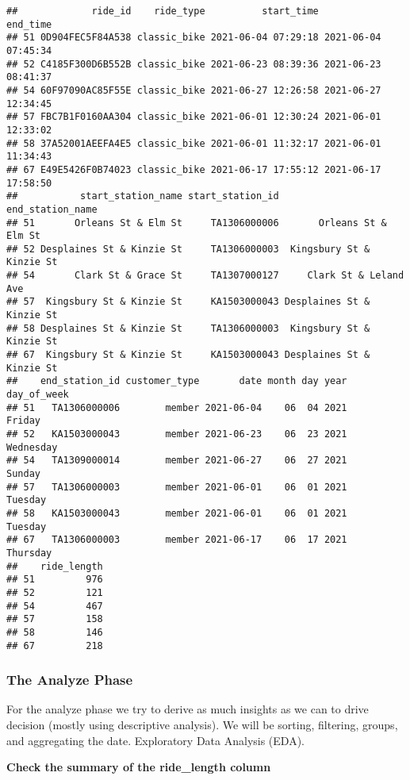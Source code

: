 \documentclass[
]{article}
\newenvironment{Shaded}{\begin{snugshade}}{\end{snugshade}}
\newcommand{\FunctionTok}[1]{\textcolor[rgb]{0.00,0.00,0.00}{#1}}
\newcommand{\NormalTok}[1]{#1}
\newcommand{\SpecialCharTok}[1]{\textcolor[rgb]{0.00,0.00,0.00}{#1}}
\begin{document}
\begin{verbatim}
##             ride_id    ride_type          start_time            end_time
## 51 0D904FEC5F84A538 classic_bike 2021-06-04 07:29:18 2021-06-04 07:45:34
## 52 C4185F300D6B552B classic_bike 2021-06-23 08:39:36 2021-06-23 08:41:37
## 54 60F97090AC85F55E classic_bike 2021-06-27 12:26:58 2021-06-27 12:34:45
## 57 FBC7B1F0160AA304 classic_bike 2021-06-01 12:30:24 2021-06-01 12:33:02
## 58 37A52001AEEFA4E5 classic_bike 2021-06-01 11:32:17 2021-06-01 11:34:43
## 67 E49E5426F0B74023 classic_bike 2021-06-17 17:55:12 2021-06-17 17:58:50
##           start_station_name start_station_id          end_station_name
## 51       Orleans St & Elm St     TA1306000006       Orleans St & Elm St
## 52 Desplaines St & Kinzie St     TA1306000003  Kingsbury St & Kinzie St
## 54       Clark St & Grace St     TA1307000127     Clark St & Leland Ave
## 57  Kingsbury St & Kinzie St     KA1503000043 Desplaines St & Kinzie St
## 58 Desplaines St & Kinzie St     TA1306000003  Kingsbury St & Kinzie St
## 67  Kingsbury St & Kinzie St     KA1503000043 Desplaines St & Kinzie St
##    end_station_id customer_type       date month day year day_of_week
## 51   TA1306000006        member 2021-06-04    06  04 2021      Friday
## 52   KA1503000043        member 2021-06-23    06  23 2021   Wednesday
## 54   TA1309000014        member 2021-06-27    06  27 2021      Sunday
## 57   TA1306000003        member 2021-06-01    06  01 2021     Tuesday
## 58   KA1503000043        member 2021-06-01    06  01 2021     Tuesday
## 67   TA1306000003        member 2021-06-17    06  17 2021    Thursday
##    ride_length
## 51         976
## 52         121
## 54         467
## 57         158
## 58         146
## 67         218
\end{verbatim}

\hypertarget{the-analyze-phase}{%
\subsubsection{The Analyze Phase}\label{the-analyze-phase}}

For the analyze phase we try to derive as much insights as we can to
drive decision (mostly using descriptive analysis). We will be sorting,
filtering, groups, and aggregating the date. Exploratory Data Analysis
(EDA).

\textbf{Check the summary of the ride\_length column}

\begin{Shaded}
\end{Shaded}
\end{document}
